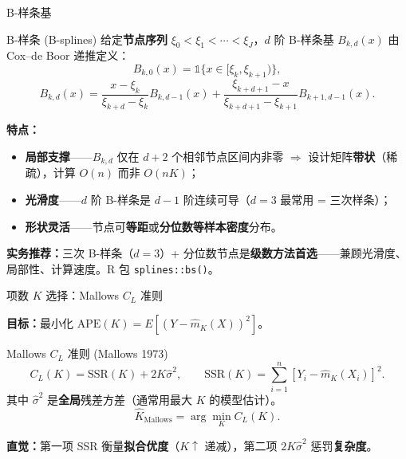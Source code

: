 \documentclass[aspectratio=169, 10pt]{beamer}
\begin{document}
\begin{frame}{B-样条基}

  \begin{definitionbox}{B-样条 (B-splines)}
    给定\textbf{节点序列} $\xi_0 < \xi_1 < \cdots < \xi_J$，$d$ 阶 B-样条基 $B_{k,d}(x)$ 由 Cox--de Boor 递推定义：
    \[
      B_{k,0}(x) = \mathds{1}\{x\in[\xi_k, \xi_{k+1})\},
    \]
    \[
      B_{k,d}(x) = \frac{x-\xi_k}{\xi_{k+d}-\xi_k} B_{k,d-1}(x) + \frac{\xi_{k+d+1}-x}{\xi_{k+d+1}-\xi_{k+1}} B_{k+1,d-1}(x).
    \]
  \end{definitionbox}

  \vspace{0.3em}

  \textbf{特点：}
  \begin{itemize}
    \item \textbf{局部支撑}——$B_{k,d}$ 仅在 $d+2$ 个相邻节点区间内非零 $\Rightarrow$ 设计矩阵\textbf{带状}（稀疏），计算 $O(n)$ 而非 $O(n K)$；
    \item \textbf{光滑度}——$d$ 阶 B-样条是 $d-1$ 阶连续可导（$d=3$ 最常用 = 三次样条）；
    \item \textbf{形状灵活}——节点可\textbf{等距}或\textbf{分位数等样本密度}分布。
  \end{itemize}

  \begin{keybox}
    \textbf{实务推荐：}三次 B-样条（$d=3$）+ 分位数节点是\textbf{级数方法首选}——兼顾光滑度、局部性、计算速度。R 包 \texttt{splines::bs()}。
  \end{keybox}

\end{frame}


\begin{frame}{项数 $K$ 选择：Mallows $C_L$ 准则}

  \textbf{目标：}最小化 $\text{APE}(K) = E[(Y - \hat m_K(X))^2]$。

  \begin{definitionbox}{Mallows $C_L$ 准则 (Mallows 1973)}
    \[
      C_L(K) = \text{SSR}(K) + 2 K \hat\sigma^2,\qquad \text{SSR}(K) = \sum_{i=1}^n [Y_i - \hat m_K(X_i)]^2.
    \]
    其中 $\hat\sigma^2$ 是\textbf{全局}残差方差（通常用最大 $K$ 的模型估计）。
    \[
      \hat K_{\text{Mallows}} = \arg\min_K C_L(K).
    \]
  \end{definitionbox}

  \textbf{直觉：}第一项 SSR 衡量\textbf{拟合优度}（$K\uparrow$ 递减），第二项 $2K\hat\sigma^2$ 惩罚\textbf{复杂度}。

\end{frame}
\end{document}
